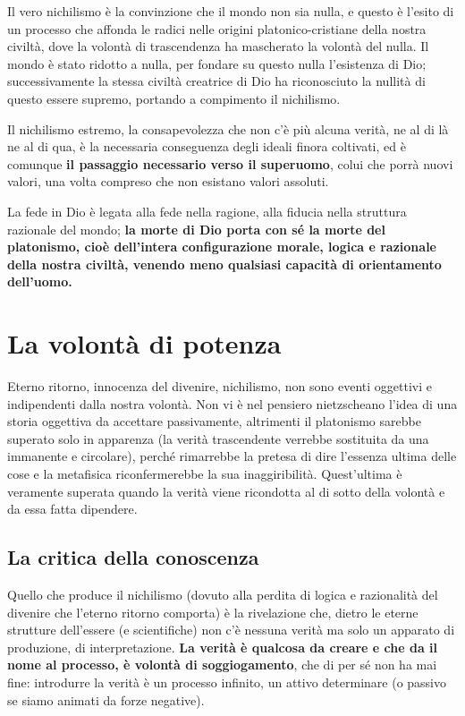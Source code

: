 Il vero nichilismo è la convinzione che il mondo non sia nulla, e questo è l'esito di un processo che affonda le radici nelle origini platonico-cristiane della nostra civiltà, dove la volontà di trascendenza ha mascherato la volontà del nulla. Il mondo è stato ridotto a nulla, per fondare su questo nulla l'esistenza di Dio; successivamente la stessa civiltà creatrice di Dio ha riconosciuto la nullità di questo essere supremo, portando a compimento il nichilismo.

Il nichilismo estremo, la consapevolezza che non c'è più alcuna verità, ne al di là ne al di qua, è la necessaria conseguenza degli ideali finora coltivati, ed è comunque \textbf{il passaggio necessario verso il superuomo}, colui che porrà nuovi valori, una volta compreso che non esistano valori assoluti.

La fede in Dio è legata alla fede nella ragione, alla fiducia nella struttura razionale del mondo; \textbf{la morte di Dio porta con sé la morte del platonismo, cioè dell'intera configurazione morale, logica e razionale della nostra civiltà, venendo meno qualsiasi capacità di orientamento dell'uomo.}

\section{La volontà di potenza}

Eterno ritorno, innocenza del divenire, nichilismo, non sono eventi oggettivi e indipendenti dalla nostra volontà. Non vi è nel pensiero nietzscheano l'idea di una storia oggettiva da accettare passivamente, altrimenti il platonismo sarebbe superato solo in apparenza (la verità trascendente verrebbe sostituita da una immanente e circolare), perché rimarrebbe la pretesa di dire l'essenza ultima delle cose e la metafisica riconfermerebbe la sua inaggiribilità. Quest'ultima è veramente superata quando la verità viene ricondotta al di sotto della volontà e da essa fatta dipendere.

\subsection{La critica della conoscenza}

Quello che produce il nichilismo (dovuto alla perdita di logica e razionalità del divenire che l'eterno ritorno comporta) è la rivelazione che, dietro le eterne strutture dell'essere (e scientifiche) non c'è nessuna verità ma solo un apparato di produzione, di interpretazione. \textbf{La verità è qualcosa da creare e che da il nome al processo, è volontà di soggiogamento}, che di per sé non ha mai fine: introdurre la verità è un processo infinito, un attivo determinare (o passivo se siamo animati da forze negative).

